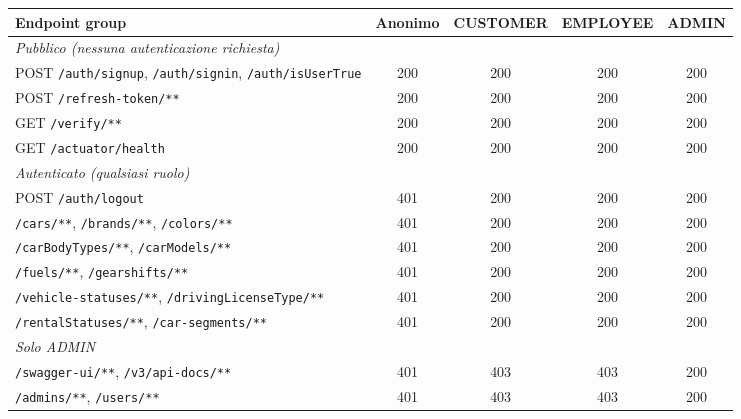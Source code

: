 \documentclass[12pt, a4paper]{article}
\begin{document}
    \begin{table}[H]
        \centering
        \small
        \renewcommand{\arraystretch}{1.25}
        \begin{tabular}{|p{5.2cm}|c|c|c|c|}
            \hline
            \textbf{Endpoint group} & \textbf{Anonimo} & \textbf{CUSTOMER} & \textbf{EMPLOYEE} & \textbf{ADMIN} \\
            \hline
            \multicolumn{5}{|l|}{\textit{Pubblico (nessuna autenticazione richiesta)}} \\
            \hline
            POST \texttt{/auth/signup}, \texttt{/auth/signin}, \texttt{/auth/isUserTrue} & 200 & 200 & 200 & 200 \\
            POST \texttt{/refresh-token/**}                                               & 200 & 200 & 200 & 200 \\
            GET \texttt{/verify/**}                                                        & 200 & 200 & 200 & 200 \\
            GET \texttt{/actuator/health}                                                  & 200 & 200 & 200 & 200 \\
            \hline
            \multicolumn{5}{|l|}{\textit{Autenticato (qualsiasi ruolo)}} \\
            \hline
            POST \texttt{/auth/logout}                                                     & 401 & 200 & 200 & 200 \\
            \texttt{/cars/**}, \texttt{/brands/**}, \texttt{/colors/**}                   & 401 & 200 & 200 & 200 \\
            \texttt{/carBodyTypes/**}, \texttt{/carModels/**}                             & 401 & 200 & 200 & 200 \\
            \texttt{/fuels/**}, \texttt{/gearshifts/**}                                   & 401 & 200 & 200 & 200 \\
            \texttt{/vehicle-statuses/**}, \texttt{/drivingLicenseType/**}               & 401 & 200 & 200 & 200 \\
            \texttt{/rentalStatuses/**}, \texttt{/car-segments/**}                        & 401 & 200 & 200 & 200 \\
            \hline
            \multicolumn{5}{|l|}{\textit{Solo ADMIN}} \\
            \hline
            \texttt{/swagger-ui/**}, \texttt{/v3/api-docs/**}                             & 401 & 403 & 403 & 200 \\
            \texttt{/admins/**}, \texttt{/users/**}                                       & 401 & 403 & 403 & 200 \\

\end{tabular}
\end{table}
\end{document}
